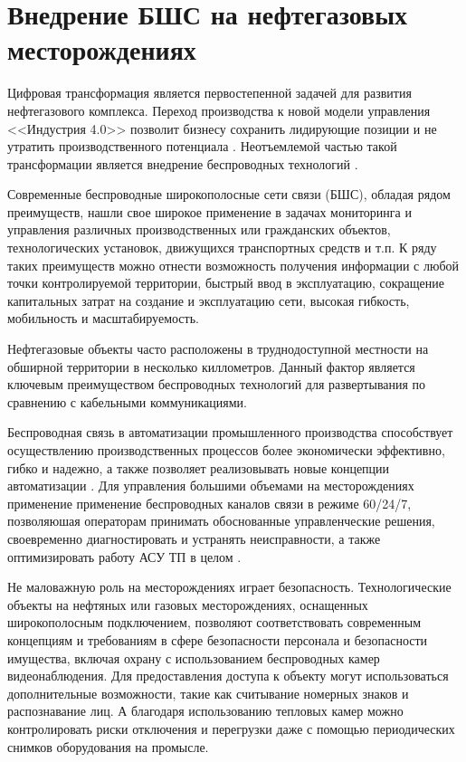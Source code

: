 \chapter{Внедрение БШС на нефтегазовых месторождениях}\label{ch:ch1}


Цифровая трансформация является первостепенной задачей для развития нефтегазового комплекса. Переход производства к новой модели управления <<Индустрия 4.0>> позволит бизнесу сохранить лидирующие позиции и не утратить производственного потенциала  \cite{Eremin2020, Dmitrievskiy2020}. Неотъемлемой частью такой трансформации является внедрение беспроводных технологий \cite{Eremin2020, Dmitrievskiy2020, Eremin2019, Hiriyannaiah2020, Munirathinam2020, CarmenLucas-Estan2018, Lu2019}. 


Современные беспроводные широкополосные сети связи (БШС), обладая рядом преимуществ, нашли свое широкое применение в задачах мониторинга и управления различных   производственных или гражданских объектов, технологических установок, движущихся транспортных средств и т.п. К ряду таких преимуществ можно отнести возможность получения информации с любой точки контролируемой территории, быстрый ввод в эксплуатацию, сокращение капитальных затрат на создание и эксплуатацию сети, высокая гибкость, мобильность и масштабируемость. 


Нефтегазовые объекты часто расположены в труднодоступной местности на обширной территории в несколько киллометров. Данный фактор является ключевым преимуществом беспроводных технологий для развертывания по сравнению с кабельными коммуникациями.

Беспроводная связь в автоматизации промышленного производства способствует осуществлению производственных процессов более экономически эффективно, гибко и надежно, а также позволяет реализовывать новые концепции автоматизации \cite{Gost62657}. Для управления большими объемами на месторождениях применение применение беспроводных каналов связи в режиме 60/24/7, позволяюшая операторам принимать обоснованные управленческие решения, своевременно диагностировать и устранять неисправности, а также оптимизировать работу АСУ ТП в целом \cite{Dmitrievsky2021}.

Не маловажную роль на месторождениях играет безопасность. Технологические объекты на нефтяных или газовых месторождениях, оснащенных широкополосным подключением, позволяют соответствовать современным концепциям и требованиям в сфере безопасности персонала и безопасности имущества, включая охрану с использованием беспроводных камер видеонаблюдения. Для предоставления доступа к объекту могут использоваться дополнительные возможности, такие как считывание номерных знаков и распознавание лиц. А благодаря использованию тепловых камер можно контролировать риски отключения и перегрузки даже с помощью периодических снимков оборудования на промысле. 

